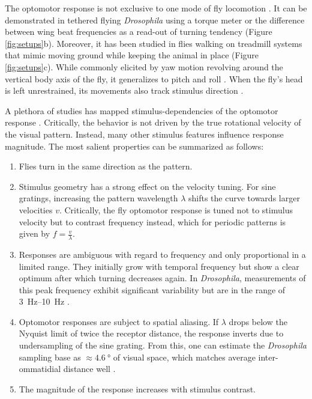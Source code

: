 The optomotor response is not exclusive to one mode of fly locomotion \citep{Fermi:1963aa,Gotz:1964bj,Goetz:1973aa,Buchner:1976kd,Goetz:1987aa}. It can be demonstrated in tethered flying \textit{Drosophila} using a torque meter or the difference between wing beat frequencies as a read-out of turning tendency (Figure \ref{fig:setups}b). Moreover, it has been studied in flies walking on treadmill systems that mimic moving ground while keeping the animal in place (Figure \ref{fig:setups}c). While commonly elicited by yaw motion revolving around the vertical body axis of the fly, it generalizes to pitch and roll \citep{Blondeau:1982hd}. When the fly's head is left unrestrained, its movements also track stimulus direction \citep{Hengstenberg:1988kg}.

A plethora of studies has mapped stimulus-dependencies of the optomotor response \citep[see][]{Borst:2010fk}. Critically, the behavior is not driven by the true rotational velocity of the visual pattern. Instead, many other stimulus features influence response magnitude. The most salient properties can be summarized as follows:

\begin{enumerate}
    \item Flies turn in the same direction as the pattern.
    \item Stimulus geometry has a strong effect on the velocity tuning. For sine gratings, increasing the pattern wavelength $\lambda$ shifts the curve towards larger velocities $v$. Critically, the fly optomotor response is tuned not to stimulus velocity but to contrast frequency instead, which for periodic patterns is given by $f = \frac{v}{\lambda}$.
    \item Responses are ambiguous with regard to frequency and only proportional in a limited range. They initially grow with temporal frequency but show a clear optimum after which turning decreases again. In \textit{Drosophila}, measurements of this peak frequency exhibit significant variability but are in the range of \SIrange{3}{10}{\hertz} \citep{Goetz:1973aa,Duistermars:2007aa}.
    \item Optomotor responses are subject to spatial aliasing. If $\lambda$ drops below the Nyquist limit of twice the receptor distance, the response inverts due to undersampling of the sine grating. From this, one can estimate the \textit{Drosophila} sampling base as $\approx \SI{4.6}{\degree}$ of visual space, which matches average inter-ommatidial distance well \citep{Gotz:1964bj}.
    \item The magnitude of the response increases with stimulus contrast.
\end{enumerate}

